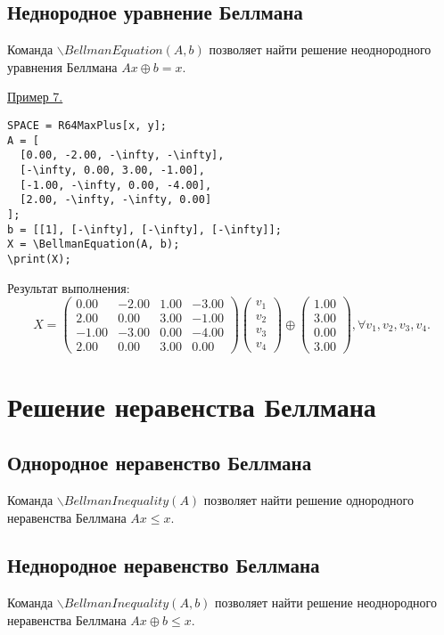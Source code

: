 \subsection{Неднородное уравнение Беллмана}
Команда $\backslash BellmanEquation(A,b)$ позволяет найти решение неоднородного уравнения Беллмана $Ax\oplus b=x$.
\smallskip

\underline{Пример 7. }

\vspace*{-3mm}
\begin{verbatim}
SPACE = R64MaxPlus[x, y];
A = [
  [0.00, -2.00, -\infty, -\infty],
  [-\infty, 0.00, 3.00, -1.00],
  [-1.00, -\infty, 0.00, -4.00],
  [2.00, -\infty, -\infty, 0.00]
];
b = [[1], [-\infty], [-\infty], [-\infty]]; 
X = \BellmanEquation(A, b); 
\print(X);
\end{verbatim}

Результат выполнения:\\
$$X=
 \left(\begin{array}{cccc}
0.00 & -2.00 & 1.00 & -3.00\\
2.00 & 0.00 & 3.00 & -1.00\\
-1.00 & -3.00 & 0.00 & -4.00\\
2.00 & 0.00 & 3.00 & 0.00
\end{array}\right)
\left(\begin{array}{c}
v_{1}\\
v_{2}\\
v_{3}\\
v_{4}
\end{array}\right)
\oplus\left(\begin{array}{c}
1.00\\
3.00\\
0.00\\
3.00
\end{array}\right), \forall v_{1}, v_{2}, v_{3}, v_{4}.$$
\section{Решение неравенства Беллмана}
\subsection{Однородное неравенство Беллмана}
Команда $\backslash BellmanInequality(A)$ позволяет найти решение однородного неравенства Беллмана $Ax\leq x$.

\subsection{Неднородное неравенство Беллмана}
Команда $\backslash BellmanInequality(A, b)$ позволяет найти решение неоднородного неравенства Беллмана $Ax\oplus b\leq x$.

